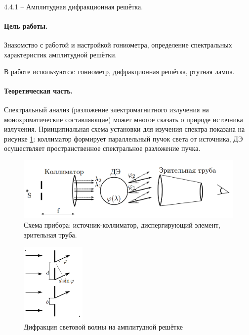 \documentclass{../lab_class}
\begin{document}

{\Large 4.4.1 -- Амплитудная дифракционная решётка.}

\paragraph{Цель работы.}
Знакомство с работой и настройкой гониометра, определение спектральных характеристик амплитудной решётки.

В работе используются: гониометр, дифракционная решётка, ртутная лампа.

\paragraph{Теоретическая часть.}
Спектральный анализ (разложение электромагнитного излучения на монохроматические составляющие) может многое сказать о природе источника излучения. Принципиальная схема установки для изучения спектра показана на рисунке \ref{fig:scheme}: коллиматор формирует параллельный пучок света от источника, ДЭ осуществляет пространственное спектральное разложение пучка. 

\begin{figure}[H]
	\centering
	\includegraphics[width=12cm]{scheme.png}
	\caption{Схема прибора: источник-коллиматор, диспергирующий элемент, зрительная труба.}
	\label{fig:scheme}
\end{figure}

\begin{figure}
  \vspace{-20pt}
  \begin{center}
    \includegraphics[width=0.28\textwidth]{lattice.png}
  \end{center}
  \vspace{-20pt}
  \caption{Дифракция световой волны на амплитудной решётке}
  \label{fig:lattice}
  \vspace{-10pt}
\end{figure}
\end{document}
